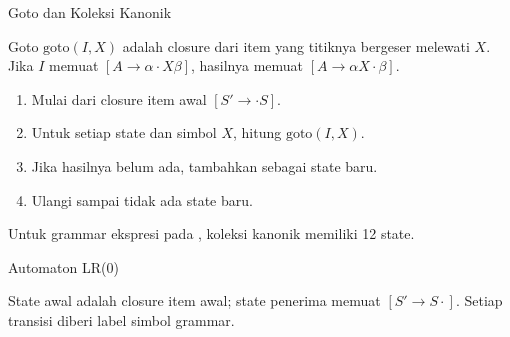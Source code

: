 \documentclass[aspectratio=169,10pt,t]{beamer}
\begin{document}
\begin{frame}{Goto dan Koleksi Kanonik}
  \begin{block}{Goto}
    \small
    \(\text{goto}(I,X)\) adalah closure dari item yang titiknya
    bergeser melewati \(X\). Jika \(I\) memuat
    \([A \to \alpha \cdot X\beta]\), hasilnya memuat
    \([A \to \alpha X \cdot \beta]\).
  \end{block}

  \begin{enumerate}
    \setlength{\itemsep}{1pt}
    \item Mulai dari closure item awal \([S' \to \cdot S]\).
    \item Untuk setiap state dan simbol \(X\), hitung
          \(\text{goto}(I,X)\).
    \item Jika hasilnya belum ada, tambahkan sebagai state baru.
    \item Ulangi sampai tidak ada state baru.
  \end{enumerate}

  \vspace{2pt}
  {\footnotesize Untuk grammar ekspresi pada
  , koleksi kanonik memiliki 12 state.}
\end{frame}

\begin{frame}{Automaton LR(0)}
  \begin{center}
  \end{center}

  \vspace{2pt}
  {\footnotesize State awal adalah closure item awal; state penerima
  memuat \([S' \to S \cdot]\). Setiap transisi diberi label simbol
  grammar.}
\end{frame}
\end{document}
